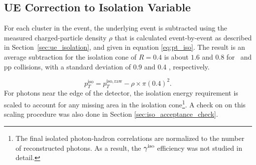 
\subsection{UE Correction to Isolation Variable}
\label{sec:ue_correction_isolation}
For each cluster in the event, the underlying event is subtracted using the measured charged-particle density $\rho$ that is calculated event-by-event as described in Section~\ref{sec:ue_isolation}, and given in equation \ref{eq:pt_iso}. The result is an average subtraction for the isolation cone of {$R=0.4$} is about {$1.6$ \GeVc} and {$0.8$ \GeVc} for \pPb~and pp collisions, with a standard deviation of {0.9 \GeVc} and {0.4 \GeVc}, respectively.  



\begin{equation}
p_T^\mathrm{iso} = p_T^\mathrm{iso,raw} - \rho\times\pi(0.4)^{2}.
\label{eq:pt_iso}
\end{equation}
For photons near the edge of the detector, the isolation energy requirement is scaled to account for any missing area in the isolation cone\footnote{The final isolated photon-hadron correlations are normalized to the number of reconstructed photons. As a result, the $\gamma^\mathrm{iso}$ efficiency was not studied in detail.}. A check on on this scaling procedure was also done in Section \ref{sec:iso_acceptance_check}. 

